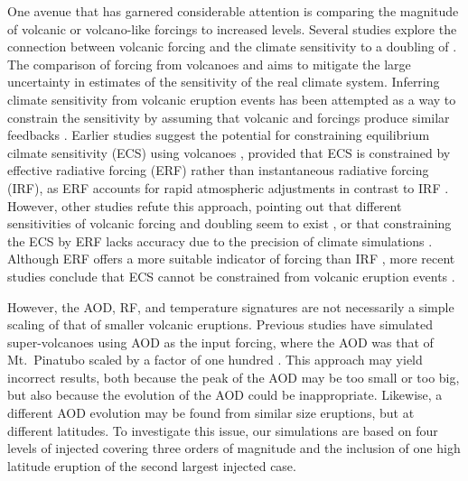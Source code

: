 \documentclass[draft]{agujournal2019}
\begin{document}
  One avenue that has garnered considerable attention is comparing the magnitude of
  volcanic or volcano-like forcings to increased  levels. Several studies
  explore the connection between volcanic forcing and the climate sensitivity to a
  doubling of 
  \cite{boer2007,marvel2016,merlis2014,ollila2016,richardson2019,salvi2022,wigley2005}.
  The comparison of forcing from volcanoes and  aims to mitigate the large
  uncertainty in estimates of the sensitivity of the real climate system. Inferring
  climate sensitivity from volcanic eruption events has been attempted as a way to
  constrain the sensitivity \cite{boer2007} by assuming that volcanic and 
  forcings produce similar feedbacks \cite{pauling2023}. Earlier studies suggest the
  potential for constraining equilibrium cilmate sensitivity (ECS) using volcanoes
  \cite{bender2010}, provided that ECS is constrained by effective radiative forcing
  (ERF) rather than instantaneous radiative forcing (IRF), as ERF accounts for rapid
  atmospheric adjustments in contrast to IRF \cite{richardson2019}. However, other
  studies refute this approach, pointing out that different sensitivities of volcanic
  forcing and  doubling seem to exist \cite{douglass2006}, or that constraining
  the ECS by ERF lacks accuracy due to the precision of climate simulations
  \cite{boer2007,salvi2022}. Although ERF offers a more suitable indicator of forcing
  than IRF \cite{marvel2016,richardson2019}, more recent studies conclude that ECS
  cannot be constrained from volcanic eruption events \cite{pauling2023}.

   However, the AOD, RF, and temperature signatures are not necessarily a
  simple scaling of that of smaller volcanic eruptions. Previous studies have simulated
  super-volcanoes using AOD as the input forcing, where the AOD was that of
  Mt.\ Pinatubo scaled by a factor of one hundred \cite{jones2005}. This approach may
  yield incorrect results, both because the peak of the AOD may be too small or too big,
  but also because the evolution of the AOD could be inappropriate. Likewise, a
  different AOD evolution may be found from similar size eruptions, but at different
  latitudes. To investigate this issue, our simulations are based on four levels of
  injected  covering three orders of magnitude and the inclusion of one high
  latitude eruption of the second largest injected  case.
\end{document}
